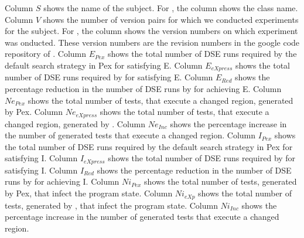 Column $S$ shows the name of the subject. For , the column shows the class name. Column $V$ shows the number of version pairs for which we conducted experiments for the subject. For , the column shows the version numbers on which experiment was onducted. These version numbers are the revision numbers in the google code repository of . Column $E_{Pex}$ shows the total number of DSE runs required by the default search strategy in Pex for satisfying E. Column $E_{eXpress}$ shows the total number of DSE runs required by  for satisfying E. Column $E_{Red}$ shows the percentage reduction in the number of DSE runs by  for achieving E. Column $Ne_{Pex}$ shows the total number of tests, that execute a changed region, generated by Pex. Column $Ne_{eXpress}$ shows the total number of tests, that execute a changed region, generated by . Column $Ne_{Inc}$ shows the percentage increase in the number of generated tests that execute a changed region. Column $I_{Pex}$ shows the total number of DSE runs required by the default search strategy in Pex for satisfying I. Column $I_{eXpress}$ shows the total number of DSE runs required by  for satisfying I. Column $I_{Red}$ shows the percentage reduction in the number of DSE runs by  for achieving I. 
Column $Ni_{Pex}$ shows the total number of tests, generated by Pex, that infect the program state. Column $Ni_{eXp}$ shows the total number of tests, generated by  , that infect the program state. Column $Ni_{Inc}$ shows the percentage increase in the number of generated tests that execute a changed region.

